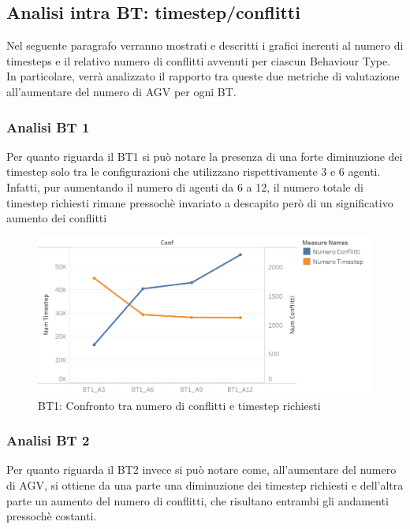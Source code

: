 \documentclass[12pt]{article}
\begin{document}
\newpage

\subsection{Analisi intra BT: timestep/conflitti}
Nel seguente paragrafo verranno mostrati e descritti i grafici inerenti al numero di timesteps e il relativo numero di conflitti avvenuti per ciascun Behaviour Type. In particolare, verrà analizzato il rapporto tra queste due metriche di valutazione all'aumentare del numero di AGV per ogni BT.

\subsubsection{Analisi BT 1}
Per quanto riguarda il BT1 si può notare la presenza di una forte diminuzione dei timestep solo tra le configurazioni che utilizzano rispettivamente 3 e 6 agenti. Infatti, pur aumentando il numero di agenti da 6 a 12, il numero totale di timestep richiesti rimane pressochè invariato a descapito però di un significativo aumento dei conflitti\\

\begin{figure}[H]
\centering
  \includegraphics[width=1\linewidth]{Figures/Results_Graphics/BT1_TimeConflicts.png}
  \caption{BT1: Confronto tra numero di conflitti e timestep richiesti}\label{fig:BT1_TimeConflicts}
\end{figure}

\subsubsection{Analisi BT 2}
Per quanto riguarda il BT2 invece si può notare come, all'aumentare del numero di AGV, si ottiene da una parte una diminuzione dei timestep richiesti e dell'altra parte un aumento del numero di conflitti, che risultano entrambi gli andamenti pressochè costanti.
\end{document}
